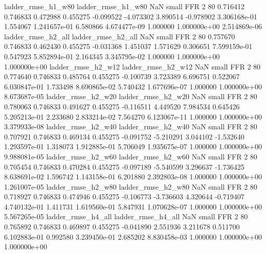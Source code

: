       ladder_rmse_h1_w80       ladder_rmse_h1_w80                   NaN      small      FFR                 2 80 0.716412       0.746833 0.472988       0.455275   -0.099522     -4.073302      3.890514    -0.978902   3.306168e-01  1.554067 1.241657e-01     6.580866   4.674477e-09            1.000000    1.000000e+00        2.514869e-06
      ladder_rmse_h2_all       ladder_rmse_h2_all                   NaN      small      FFR                 2 80 0.757670       0.746833 0.462430       0.455275   -0.031368      1.451037      1.571629     0.306651   7.599159e-01  0.547923 5.852894e-01     2.164345   3.345795e-02            1.000000    1.000000e+00        1.000000e+00
      ladder_rmse_h2_w12       ladder_rmse_h2_w12                   NaN      small      FFR                 2 80 0.774640       0.746833 0.485764       0.455275   -0.100739      3.723389      6.696751     0.522067   6.030847e-01  1.733498 8.690865e-02     5.740432   1.677696e-07            1.000000    1.000000e+00        8.673687e-05
      ladder_rmse_h2_w20       ladder_rmse_h2_w20                   NaN      small      FFR                 2 80 0.780063       0.746833 0.491627       0.455275   -0.116511      4.449520      7.984534     0.645426   5.205213e-01  2.233680 2.833214e-02     7.564270   6.123067e-11            1.000000    1.000000e+00        3.379933e-08
      ladder_rmse_h2_w40       ladder_rmse_h2_w40                   NaN      small      FFR                 2 80 0.707921       0.746833 0.469134       0.455275   -0.091752     -5.210291      3.044102    -1.532640   1.293597e-01  1.318073 1.912885e-01     5.706049   1.935675e-07            1.000000    1.000000e+00        9.988081e-05
      ladder_rmse_h2_w60       ladder_rmse_h2_w60                   NaN      small      FFR                 2 80 0.705454       0.746833 0.470284       0.455275   -0.097189     -5.540599      3.296637    -1.736425   8.638691e-02  1.596742 1.143158e-01     6.201880   2.392803e-08            1.000000    1.000000e+00        1.261007e-05
      ladder_rmse_h2_w80       ladder_rmse_h2_w80                   NaN      small      FFR                 2 80 0.718927       0.746833 0.474946       0.455275   -0.106773     -3.736603      4.320644    -0.719407   4.740132e-01  1.411731 1.619560e-01     5.847931   1.070628e-07            1.000000    1.000000e+00        5.567265e-05
      ladder_rmse_h4_all       ladder_rmse_h4_all                   NaN      small      FFR                 2 80 0.765892       0.746833 0.469897       0.455275   -0.041890      2.551936      3.211678     0.511700   6.102883e-01  0.992580 3.239450e-01     2.685202   8.830458e-03            1.000000    1.000000e+00        1.000000e+00
